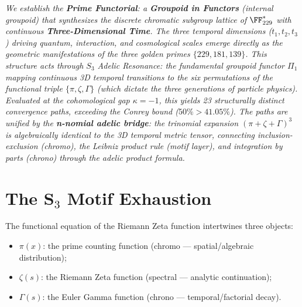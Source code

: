 
\noindent\textit{We establish the \textbf{Prime Functorial}: a \textbf{Groupoid in Functors} (internal groupoid) that synthesizes the discrete chromatic subgroup lattice of $\FF_{229}^*$ with continuous \textbf{Three-Dimensional Time}. The three temporal dimensions ($t_1, t_2, t_3$) driving quantum, interaction, and cosmological scales emerge directly as the geometric manifestations of the three golden primes $\{229, 181, 139\}$. This structure acts through $S_3$ Adelic Resonance: the fundamental groupoid functor $\Pi_1$ mapping continuous 3D temporal transitions to the six permutations of the functional triple $\{\pi, \zeta, \Gamma\}$ (which dictate the three generations of particle physics). Evaluated at the cohomological gap $\kappa = -1$, this yields 23 structurally distinct convergence paths, exceeding the Conrey bound ($50\% > 41.05\%$). The paths are unified by the \textbf{n-nomial adelic bridge}: the trinomial expansion $({\pi + \zeta + \Gamma})^3$ is algebraically identical to the 3D temporal metric tensor, connecting inclusion-exclusion (chromo), the Leibniz product rule (motif layer), and integration by parts (chrono) through the adelic product formula.}
\bigskip


\section{The S$_3$ Motif Exhaustion}
\label{sec:s3-motifs}

The functional equation of the Riemann Zeta function intertwines three objects:
\begin{itemize}[noitemsep]
\item $\pi(x)$: the prime counting function (chromo --- spatial/algebraic distribution);
\item $\zeta(s)$: the Riemann Zeta function (spectral --- analytic continuation);
\item $\Gamma(s)$: the Euler Gamma function (chrono --- temporal/factorial decay).
\end{itemize}


